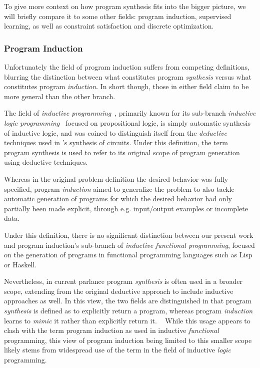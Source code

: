 \documentclass{article}
\begin{document}
To give more context on how program synthesis fits into the bigger picture,
we will briefly compare it to some other fields: program induction, supervised learning, as well as constraint satisfaction and discrete optimization.

\subsubsection{Program Induction}

Unfortunately the field of program induction suffers from competing definitions, blurring the distinction between what constitutes program \emph{synthesis} versus what constitutes program \emph{induction}. In short though, those in either field claim to be more general than the other branch.

The field of \emph{inductive programming}~\citep{popplestone1969experiment,plotkin1970note,fogel1966intelligent}, primarily known for its sub-branch \emph{inductive logic programming}~\citep{muggleton1991inductive} focused on propositional logic, is simply automatic synthesis of inductive logic, and was coined to distinguish itself from the \emph{deductive} techniques used in \citet{church1957applications}'s synthesis of circuits. Under this definition, the term program synthesis is used to refer to its original scope of program generation using deductive techniques.

Whereas in the original problem definition the desired behavior was fully specified, program \emph{induction} aimed to generalize the problem to also tackle automatic generation of programs for which the desired behavior had only partially been made explicit, through e.g. input/output examples or incomplete data.

Under this definition, there is no significant distinction between our present work and program induction's sub-branch of \emph{inductive functional programming}, focused on the generation of programs in functional programming languages such as Lisp~\citep{lisp} or Haskell.

Nevertheless, in current parlance program \emph{synthesis} is often used in a broader scope, extending from the original deductive approach to include inductive approaches as well.
In this view, the two fields are distinguished in that program \emph{synthesis} is defined as to explicitly return a program,
whereas program \emph{induction} learns to \emph{mimic} it rather than explicitly return it.%
~\citep{devlin2017robustfill,gulwani2017program,nps}
While this usage appears to clash with the term program induction as used in inductive \emph{functional} programming,
this view of program induction being limited to this smaller scope likely stems from widespread use of the term in the field of inductive \emph{logic} programming.
\end{document}
